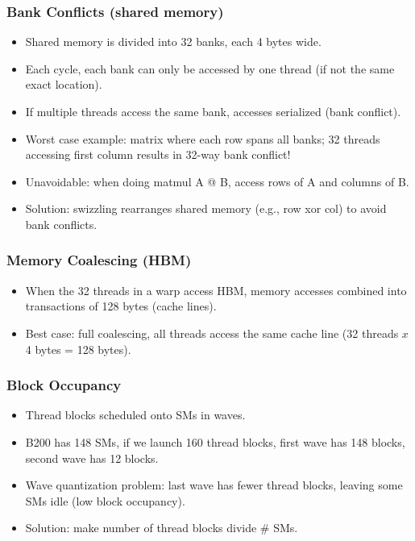 \documentclass[12pt,twoside]{article}
\begin{document}
\subsubsection*{Bank Conflicts (shared memory)}

\begin{itemize}
    \item Shared memory is divided into 32 banks, each 4 bytes wide.
    \item Each cycle, each bank can only be accessed by one thread (if not the same exact location).
    \item If multiple threads access the same bank, accesses serialized (bank conflict).
    \item Worst case example: matrix where each row spans all banks; 32 threads accessing first column results in 32-way bank conflict!
    \item Unavoidable: when doing matmul A @ B, access rows of A and columns of B.
    \item Solution: swizzling rearranges shared memory (e.g., row xor col) to avoid bank conflicts.
\end{itemize}

\subsubsection*{Memory Coalescing (HBM)}

\begin{itemize}
    \item When the 32 threads in a warp access HBM, memory accesses combined into transactions of 128 bytes (cache lines).
    \item Best case: full coalescing, all threads access the same cache line (32 threads \(x\) 4 bytes = 128 bytes).
\end{itemize}

\subsubsection*{Block Occupancy}

\begin{itemize}
    \item Thread blocks scheduled onto SMs in waves.
    \item B200 has 148 SMs, if we launch 160 thread blocks, first wave has 148 blocks, second wave has 12 blocks.
    \item Wave quantization problem: last wave has fewer thread blocks, leaving some SMs idle (low block occupancy).
    \item Solution: make number of thread blocks divide \# SMs.
\end{itemize}
\end{document}
